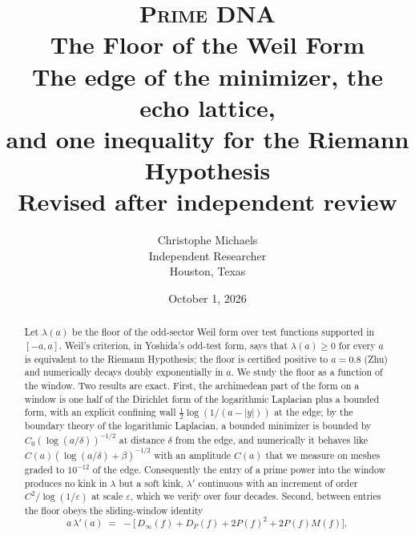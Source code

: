 \documentclass[11pt]{article}
\title{\textsc{Prime DNA}\\[1ex]
\textbf{The Floor of the Weil Form}\\[1ex]
\large The edge of the minimizer, the echo lattice,\\ and one inequality for the Riemann Hypothesis\\[1ex]
\normalsize Revised after independent review}
\author{Christophe Michaels\\ Independent Researcher\\ Houston, Texas}
\date{October 1, 2026}
\theoremstyle{definition}
\theoremstyle{remark}
\begin{document}
\maketitle

\begin{abstract}
Let $\lambda(a)$ be the floor of the odd-sector Weil form over test functions supported in $[-a,a]$. Weil's criterion, in Yoshida's odd-test form, says that $\lambda(a)\ge 0$ for every $a$ is equivalent to the Riemann Hypothesis; the floor is certified positive to $a=0.8$ (Zhu) and numerically decays doubly exponentially in $a$. We study the floor as a function of the window. Two results are exact. First, the archimedean part of the form on a window is one half of the Dirichlet form of the logarithmic Laplacian plus a bounded form, with an explicit confining wall $\tfrac12\log(1/(a-|y|))$ at the edge; by the boundary theory of the logarithmic Laplacian, a bounded minimizer is bounded by $C_0(\log(a/\delta))^{-1/2}$ at distance $\delta$ from the edge, and numerically it behaves like $C(a)(\log(a/\delta)+\beta)^{-1/2}$ with an amplitude $C(a)$ that we measure on meshes graded to $10^{-12}$ of the edge. Consequently the entry of a prime power into the window produces no kink in $\lambda$ but a soft kink, $\lambda'$ continuous with an increment of order $C^2/\log(1/\varepsilon)$ at scale $\varepsilon$, which we verify over four decades. Second, between entries the floor obeys the sliding-window identity
\[
a\,\lambda'(a) \;=\; -\Big[\,D_\infty(f)+D_P(f)+2P(f)^2+2P(f)M(f)\Big],
\]

\end{abstract}
\end{document}
